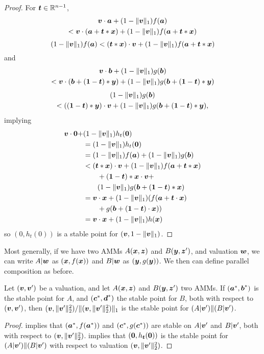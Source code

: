   \begin{proof}
    For $\bt \in \Reals^{n-1}$,
    \begin{multline*}
      \bv \cdot \ba + (1-\|\bv\|_1)f(\ba)\\
      < \bv \cdot (\ba + \bt * \bx) + (1-\|\bv\|_1)f(\ba + \bt * \bx)
    \end{multline*}
    \begin{equation*}
      (1-\|\bv\|_1)f(\ba)
      < (\bt * \bx) \cdot \bv + (1-\|\bv\|_1)f(\ba + \bt * \bx)
    \end{equation*}
    and
    \begin{multline*}
      \bv \cdot \bb + (1-\|\bv\|_1)g(\bb)\\
      < \bv \cdot (\bb + (\bone - \bt) * \by) + (1-\|\bv\|_1)g(\bb + (\bone - \bt) * \by)
    \end{multline*}
    \begin{multline*}
      (1-\|\bv\|_1)g(\bb) \\
      < ((\bone - \bt) * \by) \cdot \bv + (1-\|\bv\|_1)g(\bb + (\bone - \bt) * \by),
     \end{multline*}
implying
\begin{align*}
  \bv \cdot \bzero + &(1-\|\bv\|_1)h_t(\bzero) \\
  &= (1-\|\bv\|_1)h_t(\bzero) \\
  &= (1-\|\bv\|_1)f(\ba) +(1-\|\bv\|_1)g(\bb) \\
  &< (\bt * \bx) \cdot \bv + (1-\|\bv\|_1)f(\ba + \bt * \bx) \\
  &\quad \quad+ (\bone-\bt) * \bx \cdot \bv + \\
  &\quad \quad (1-\|\bv\|_1)g(\bb + (\bone-\bt) * \bx)\\
    &= \bv \cdot \bx + (1-\|\bv\|_1)(f(\ba + \bt \cdot \bx) \\
    &\quad \quad + g(\bb + (\bone-\bt) \cdot \bx))  \\
    &= \bv \cdot \bx + (1-\|\bv\|_1)h(\bx)
\end{align*}
so $(0,h_t(0))$ is a stable point for $(\bv,1-\|\bv\|_1)$.
\end{proof}
Most generally, if we have two AMMs $A(\bx,\bz)$ and $B(\by,\bz')$, and valuation $\bw$,
we can write $A| \bw$ as $(\bx,f(\bx))$ and $B| \bw$ as $(\by,g(\by))$.
We then can define parallel composition as before.

\begin{theorem}
    Let $(\bv,\bv')$ be a valuation, and let $A(\bx,\bz)$ and $B(\by,\bz')$ two AMMs.
    If $(\ba^{*},\bb^{*})$ is the stable point for $A$,
    and $(\bc^{*},\bd^{*})$ the stable point for $B$,
    both with respect to $(\bv,\bv')$,
    then $(\bv,\|\bv'\|_2^2)/\|(\bv,\|\bv'\|_2^2)\|_1$ is the stable point for $(A | \bv' ) \| (B | \bv')$.
\end{theorem}

\begin{proof}\sloppy
   implies that $(\ba^{*},f(\ba^{*}))$ and $(\bc^{*},g(\bc^{*}))$
  are stable on $A | \bv'$ and $B | \bv'$,
  both with respect to $(\bv,\|\bv'\|_2^2)$. 
 implies that $(\bzero,h_{\bt}(\bzero))$
is the stable point for
$(A | \bv' ) \| (B | \bv')$ with respect to valuation $(\bv,\|\bv'\|_2^2)$.
\end{proof}
